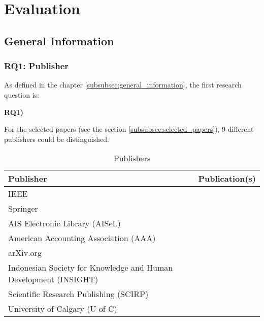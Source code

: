 \section{Evaluation}
\label{sec:Evaluation}

\subsection{General Information}
\label{subsec:GeneralInformation}

\subsubsection{RQ1: Publisher}
\label{subsubsec:RQ1}
As defined in the chapter \ref{subsubsec:general_information}, the first research question is:
\begin{displayquote}
\textbf{RQ1) }
\end{displayquote}
For the selected papers (see the section \ref{subsubsec:selected_papers}), 9 different publishers could be distinguished. 
\begin{table}[!ht]
\begin{center}
\begin{tabular}{ |p{7cm}|c| }
	\hline
 	Publisher & Publication(s) \\ [0.5ex] 
 	\hline\hline
 		IEEE  & \cite{2015_Zyskind,2017_Gipp,2016_Kianmajd,2016_Yasin,2015_Dennis,2016_Azaria,2016_Tian} \\ 
	 \hline
	 Springer & \cite{2017_Tackmann,2016_Schaub,2016_Jacynycz,2016_Sharples,2017_Jaag,2017_Ouaddah,2016_Yue} \\  
	 \hline
	 AIS Electronic Library (AISeL) & \cite{2017_Madhwal,2017_Naerland} \\ 
	 \hline
	 American Accounting Association (AAA) & \cite{2017_Coyne} \\  
	 \hline
	 arXiv.org & \cite{2018_Lucena} \\  
	 \hline
	 Indonesian Society for Knowledge and Human Development (INSIGHT) & \cite{2018_Alessandra} \\
	 \hline
	 Scientific Research Publishing (SCIRP) & \cite{2016_Bahga} \\ 
	 \hline
	 University of Calgary (U of C) & \cite{2017_Liu} \\ 
	 \hline
\end{tabular}
\end{center}
\caption{Publishers} \label{tab:rq1_publisher}
\end{table}

